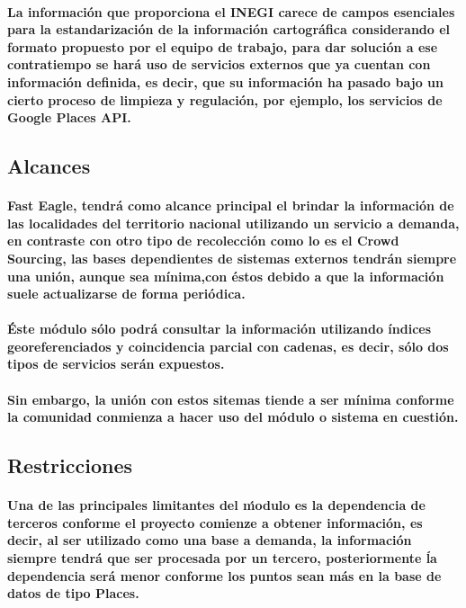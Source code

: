     \paragraph{La información que proporciona el INEGI carece de campos esenciales para la estandarización de la información cartográfica considerando el formato propuesto por el equipo de trabajo, para dar solución a ese contratiempo se hará uso de servicios externos que ya cuentan con información definida, es decir, que su información ha pasado bajo un cierto proceso de limpieza y regulación, por ejemplo, los servicios de Google Places API.}
  \subsection{Alcances}
    \paragraph{Fast Eagle, tendrá como alcance principal el brindar la información de las localidades del territorio nacional utilizando un servicio a demanda, en contraste con otro tipo de recolección como lo es el Crowd Sourcing\cite{37}, las bases dependientes de sistemas externos tendrán siempre una unión, aunque sea mínima,con éstos debido a que la información suele actualizarse de forma periódica.}
    \paragraph{Éste módulo sólo podrá consultar la información utilizando índices georeferenciados y coincidencia parcial con cadenas, es decir, sólo dos tipos de servicios serán expuestos.} 
    \paragraph{Sin embargo, la unión con estos sitemas tiende a ser mínima conforme la comunidad conmienza a hacer uso del módulo o sistema en cuestión.}
  \subsection{Restricciones}
    \paragraph{Una de las principales limitantes del ḿodulo es la dependencia de terceros conforme el proyecto comienze a obtener información, es decir, al ser utilizado como una base a demanda, la información siempre tendrá que ser procesada por un tercero, posteriormente ĺa dependencia será menor conforme los puntos sean más en la base de datos de tipo Places.}
